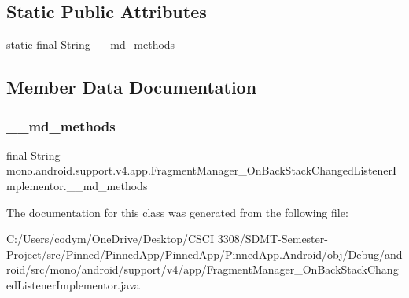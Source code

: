 \subsection*{Static Public Attributes}
\begin{DoxyCompactItemize}
\item 
static final String \hyperlink{classmono_1_1android_1_1support_1_1v4_1_1app_1_1_fragment_manager___on_back_stack_changed_listener_implementor_ae3a9121b1e65698984587cc5620a10b7}{\+\_\+\+\_\+md\+\_\+methods}
\end{DoxyCompactItemize}


\subsection{Member Data Documentation}
\mbox{\label{classmono_1_1android_1_1support_1_1v4_1_1app_1_1_fragment_manager___on_back_stack_changed_listener_implementor_ae3a9121b1e65698984587cc5620a10b7}} 
\subsubsection{\texorpdfstring{\+\_\+\+\_\+md\+\_\+methods}{\_\_md\_methods}}
{\footnotesize\ttfamily final String mono.\+android.\+support.\+v4.\+app.\+Fragment\+Manager\+\_\+\+On\+Back\+Stack\+Changed\+Listener\+Implementor.\+\_\+\+\_\+md\+\_\+methods\hspace{0.3cm}{\ttfamily [static]}}



The documentation for this class was generated from the following file\+:\begin{DoxyCompactItemize}
\item 
C\+:/\+Users/codym/\+One\+Drive/\+Desktop/\+C\+S\+C\+I 3308/\+S\+D\+M\+T-\/\+Semester-\/\+Project/src/\+Pinned/\+Pinned\+App/\+Pinned\+App/\+Pinned\+App.\+Android/obj/\+Debug/android/src/mono/android/support/v4/app/Fragment\+Manager\+\_\+\+On\+Back\+Stack\+Changed\+Listener\+Implementor.\+java\end{DoxyCompactItemize}
